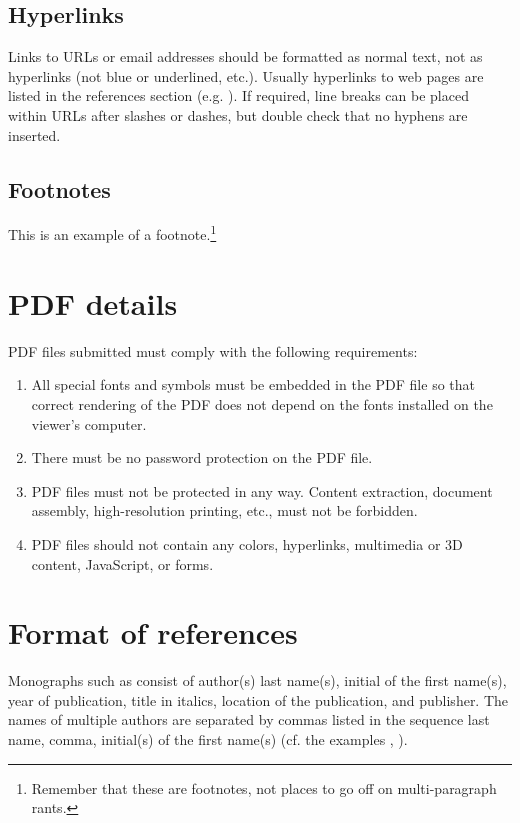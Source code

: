 \documentclass{tls}
\begin{document}
\subsection{Hyperlinks}

Links to URLs or email addresses should be formatted as normal text, not as hyperlinks (not blue or underlined, etc.). Usually hyperlinks to web pages are listed in the references section (e.g. ). If required, line breaks can be placed within URLs after slashes or dashes, but double check that no hyphens are inserted.

\subsection{Footnotes}

This is an example of a footnote.\footnote{Remember that these are footnotes, not places to go off on multi-paragraph rants.}


\section{PDF details}

PDF files submitted must comply with the following requirements:

\begin{enumerate}
  \item All special fonts and symbols must be embedded in the PDF file so that correct rendering of the PDF does not depend on the fonts installed on the viewer's computer.
  \item There must be no password protection on the PDF file.
  \item PDF files must not be protected in any way. Content extraction, document assembly, high-resolution printing, etc., must not be forbidden.
  \item PDF files should not contain any colors, hyperlinks, multimedia or 3D content, JavaScript, or forms.
\end{enumerate}

\section{Format of references}

Monographs such as  consist of author(s) last name(s), initial of the first name(s), year of publication, title in italics, location of the publication, and publisher. The names of multiple authors are separated by commas listed in the sequence last name, comma, initial(s) of the first name(s) (cf. the examples , ).
\end{document}
